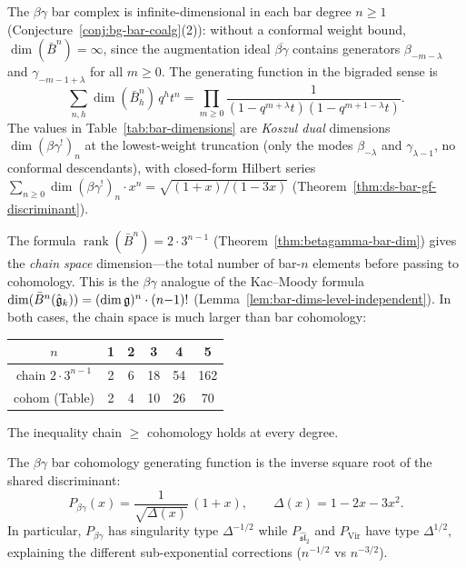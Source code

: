 \begin{remark}\label{rem:betagamma-conventions}
The $\beta\gamma$ bar complex is infinite-dimensional in each bar
degree $n \geq 1$ (Conjecture~\ref{conj:bg-bar-coalg}(2)):
without a conformal weight bound,
$\dim(\bar{B}^n) = \infty$, since the augmentation ideal
$\overline{\beta\gamma}$ contains generators $\beta_{-m-\lambda}$
and $\gamma_{-m-1+\lambda}$ for all $m \geq 0$.
The generating function in the bigraded sense is
\[
\sum_{n,h} \dim(\bar{B}^n_h)\, q^h t^n
= \prod_{m \geq 0}
  \frac{1}{(1-q^{m+\lambda}t)(1-q^{m+1-\lambda}t)}.
\]
The values in Table~\ref{tab:bar-dimensions}
are \emph{Koszul dual} dimensions $\dim (\beta\gamma^!)_n$
at the lowest-weight truncation (only the modes
$\beta_{-\lambda}$ and $\gamma_{\lambda-1}$, no conformal descendants),
with closed-form Hilbert series
$\sum_{n \geq 0} \dim (\beta\gamma^!)_n \cdot x^n = \sqrt{(1{+}x)/(1{-}3x)}$
(Theorem~\ref{thm:ds-bar-gf-discriminant}).

The formula $\operatorname{rank}(\bar{B}^n) = 2 \cdot 3^{n-1}$
(Theorem~\ref{thm:betagamma-bar-dim}) gives the \emph{chain space}
dimension---the total number of bar-$n$ elements before passing to
cohomology.  This is the $\beta\gamma$ analogue of the Kac--Moody
formula $\dim(\bar{B}^n(\hat{\mathfrak{g}}_k)) = (\dim\mathfrak{g})^n \cdot (n{-}1)!$
(Lemma~\ref{lem:bar-dims-level-independent}).  In both cases,
the chain space is much larger than bar cohomology:
\begin{center}
\begin{tabular}{c|ccccc}
$n$ & 1 & 2 & 3 & 4 & 5 \\
\hline
chain $2 \cdot 3^{n-1}$ & 2 & 6 & 18 & 54 & 162 \\
cohom (Table) & 2 & 4 & 10 & 26 & 70
\end{tabular}
\end{center}
The inequality chain $\geq$ cohomology holds at every degree.
\end{remark}

\begin{corollary}
\label{cor:betagamma-inverse-discriminant}
The $\beta\gamma$ bar cohomology generating function is the inverse square root of the shared discriminant:
\[
P_{\beta\gamma}(x) = \frac{1}{\sqrt{\Delta(x)}}\,(1+x),
\qquad \Delta(x) = 1-2x-3x^2.
\]
In particular, $P_{\beta\gamma}$ has singularity type $\Delta^{-1/2}$ while $P_{\widehat{\mathfrak{sl}}_2}$ and $P_{\mathrm{Vir}}$ have type $\Delta^{1/2}$, explaining the different sub-exponential corrections ($n^{-1/2}$ vs $n^{-3/2}$).
\end{corollary}

